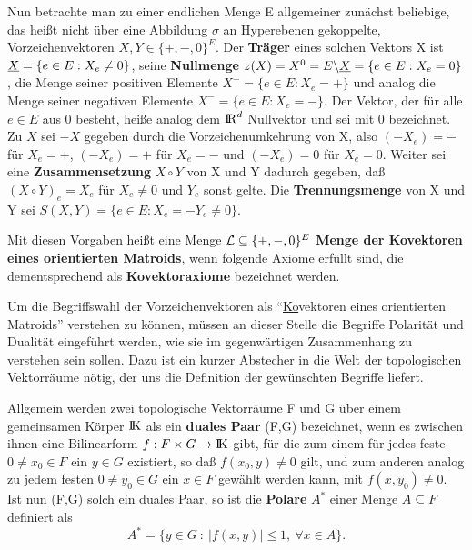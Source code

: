 Nun betrachte man zu einer endlichen Menge E allgemeiner zunächst beliebige,
das heißt nicht über eine Abbildung $\sigma$ an Hyperebenen gekoppelte,
Vorzeichenvektoren $X,Y\in\{+,-,0\}^E$.
Der {\bf Träger} eines solchen Vektors X ist
$\underline{X}=\{e\in E:X_e\neq 0\}$, seine {\bf Nullmenge}
 $z(X)=X^0=E\backslash\underline{X}=\{e\in E:X_e=0\}$,
die Menge seiner positiven Elemente $X^+=\{e\in E:X_e=+\}$ und analog die Menge
seiner negativen Elemente $X^-=\{e\in E:X_e=-\}$. Der Vektor, der für alle
$e\in E$ aus 0 besteht, heiße analog dem $\mbox{$\rm I\!R$}^d$ Nullvektor und sei mit 0
bezeichnet. Zu $X$ sei $-X$ gegeben durch die Vorzeichenumkehrung von X, also
$(-X_e)=-$ für $X_e=+$, $(-X_e)=+$ für $X_e=-$ und $(-X_e)=0$ für $X_e=0$.
Weiter sei eine {\bf Zusammensetzung}
$X\circ Y$ von X und Y dadurch gegeben, daß $(X\circ Y)_e=X_e$ für
$X_e\neq 0$ und $Y_e$ sonst gelte. Die {\bf Trennungsmenge}
 von X und Y sei
$S(X,Y)=\{e\in E:X_e=-Y_e\neq 0\}$.

Mit diesen Vorgaben heißt eine Menge ${\cal L}\subseteq\{+,-,0\}^E$ {\bf Menge
der Kovektoren eines orientierten Matroids}, wenn folgende Axiome erfüllt
sind, die dementsprechend als {\bf Kovektoraxiome}
bezeichnet werden.

\bcent
{}
\ecent

Um die Begriffswahl der Vorzeichenvektoren als "`\ul{Ko}vektoren eines
orientierten Matroids"' verstehen zu können, müssen an dieser Stelle die
Begriffe Polarität und Dualität eingeführt werden, wie sie im gegenwärtigen
Zusammenhang zu verstehen sein sollen. Dazu ist ein kurzer Abstecher in die
Welt der topologischen Vektorräume nötig, der uns die Definition der
gewünschten Begriffe liefert.

Allgemein werden zwei topologische Vektorräume F und G über einem gemeinsamen
Körper $\mbox{$\rm I\!K$}$ als ein {\bf duales Paar} (F,G) bezeichnet, wenn
es zwischen ihnen eine Bilinearform $f:F\times G\to\mbox{$\rm I\!K$}$ gibt, für die zum einem
für jedes feste $0\neq x_0\in F$ ein $y\in G$ existiert, so daß
$f(x_0,y)\neq 0$ gilt, und zum anderen analog zu jedem festen $0\neq y_0\in G$
ein $x\in F$ gewählt werden kann, mit $f(x,y_0)\neq 0$. Ist nun (F,G) solch
ein duales Paar, so ist die {\bf Polare} $A^*$ einer Menge
$A\subseteq F$ definiert als
$$ A^*=\{y\in G~:~|f(x,y)|\leq 1,~\forall x\in A\}.$$

